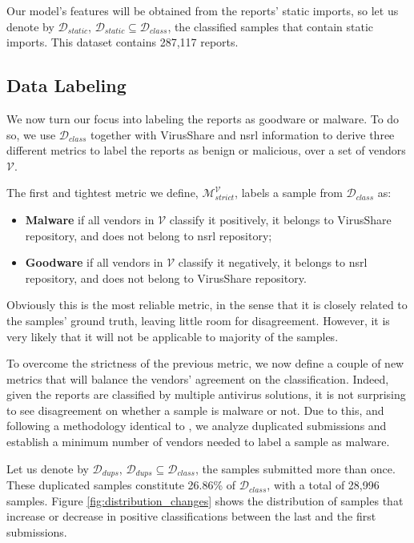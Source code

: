 Our model's features will be obtained from the reports' static imports, so let us denote by $\mathcal{D}_{static}$, $\mathcal{D}_{static} \subseteq \mathcal{D}_{class}$, the classified samples that contain static imports. This dataset contains 287,117 reports.

\subsection{Data Labeling}

We now turn our focus into labeling the reports as goodware or malware. To do so, we use $\mathcal{D}_{class}$ together with VirusShare and \gls{nsrl} information to derive three different metrics to label the reports as benign or malicious, over a set of vendors $\mathcal{V}$.

The first and tightest metric we define, $\mathcal{M}_{strict}^\mathcal{V}$, labels a sample from $\mathcal{D}_{class}$ as:

\begin{itemize}
	\item \textbf{Malware} if all vendors in $\mathcal{V}$ classify it positively, it belongs to VirusShare repository, and does not belong to \gls{nsrl} repository;
	\item \textbf{Goodware} if all vendors in $\mathcal{V}$ classify it negatively, it belongs to \gls{nsrl} repository, and does not belong to VirusShare repository.
\end{itemize}

Obviously this is the most reliable metric, in the sense that it is closely related to the samples' ground truth, leaving little room for disagreement. However, it is very likely that it
will not be applicable to majority of the samples.

To overcome the strictness of the previous metric, we now define a couple of new metrics that will balance the vendors' agreement on the classification. Indeed, given the reports are classified by multiple antivirus solutions, it is not surprising to see disagreement on whether a sample is malware or not. Due to this, and following a methodology identical to \cite{miller:rev_int}, we analyze duplicated submissions and establish a minimum number of vendors needed to label a sample as malware.

Let us denote by $\mathcal{D}_{dups}$, $\mathcal{D}_{dups} \subseteq \mathcal{D}_{class}$, the samples submitted more than once. These duplicated samples constitute 26.86\% of $\mathcal{D}_{class}$, with a total of 28,996 samples. Figure \ref{fig:distribution_changes} shows the distribution of samples that increase or decrease in positive classifications between the last and the first submissions.

